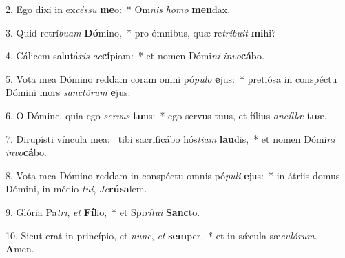 2. Ego dixi in ex\textit{cés}\textit{su} \textbf{me}o:~*  Om\textit{nis} \textit{ho}\textit{mo} \textbf{men}dax.\

3. Quid retrí\textit{bu}\textit{am} \textbf{Dó}mino,~*  pro ómnibus, quæ re\textit{trí}\textit{bu}\textit{it} \textbf{mi}hi?\

4. Cálicem salutá\textit{ris} \textit{ac}\textbf{cí}piam:~*  et nomen Dómi\textit{ni} \textit{in}\textit{vo}\textbf{cá}bo.\

5. Vota mea Dómino reddam coram omni pó\textit{pu}\textit{lo} \textbf{e}jus:~*  pretiósa in conspéctu Dómini mors \textit{sanc}\textit{tó}\textit{rum} \textbf{e}jus:\

6. O Dómine, quia ego \textit{ser}\textit{vus} \textbf{tu}us:~*  ego servus tuus, et fílius \textit{an}\textit{cíl}\textit{læ} \textbf{tu}æ.\

7. Dirupísti víncula mea: \dag\  tibi sacrificábo hós\textit{ti}\textit{am} \textbf{lau}dis,~*  et nomen Dómi\textit{ni} \textit{in}\textit{vo}\textbf{cá}bo.\

8. Vota mea Dómino reddam in conspéctu omnis pó\textit{pu}\textit{li} \textbf{e}jus:~*  in átriis domus Dómini, in médio \textit{tu}\textit{i}, \textit{Je}\textbf{rú}\textbf{sa}lem.\

9. Glória Pa\textit{tri}, \textit{et} \textbf{Fí}lio,~*  et Spi\textit{rí}\textit{tu}\textit{i} \textbf{Sanc}to.\

10. Sicut erat in princípio, et \textit{nunc}, \textit{et} \textbf{sem}per,~*  et in sǽcula sæ\textit{cu}\textit{ló}\textit{rum}. \textbf{A}men.\

